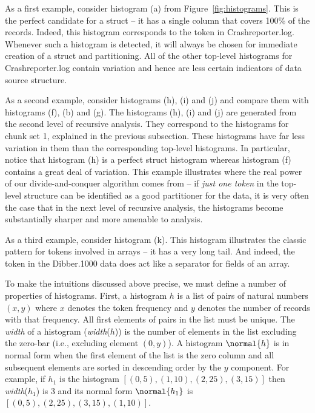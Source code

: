As a first example, consider histogram (a)
from Figure~\ref{fig:histograms}.  This is the perfect candidate for a 
struct --
it has a single column that covers 100\% of the records.  Indeed,
this histogram corresponds to the \cd{[*]} token in Crashreporter.log.
Whenever such a histogram is detected, it will always be chosen
for immediate creation of a struct and partitioning.  All of the
other top-level histograms for Crashreporter.log contain variation
and hence are less certain indicators of data source structure.

As a second example, consider histograms (h), (i) and (j) and compare
them with histograms (f), (b) and (g). The histograms (h), (i) and (j)
are generated from the second level of recursive analysis. They
correspond to the histograms for chunk set 1, explained in the
previous subsection.  These histograms have far less variation in them
than the corresponding top-level histograms.  In particular, notice
that histogram (h) is a perfect struct histogram whereas histogram (f)
contains a great deal of variation.  This example illustrates where
the real power of our divide-and-conquer algorithm comes from -- if
{\em just one token} in the top-level structure can be identified as a
good partitioner for the data, it is very often the case that in the
next level of recursive analysis, the histograms become substantially
sharper and more amenable to analysis.

As a third example, consider histogram (k).  This histogram illustrates
the classic pattern for tokens involved in arrays -- it has a very long
tail.  And indeed, the \cd{|} token in the Dibber.1000
data does act like a separator for fields of an array.

To make the intuitions discussed above precise, we must define a number of
properties of histograms.  First, a histogram $h$ is a list of pairs
of natural numbers $(x,y)$ where $x$ denotes the token frequency and
$y$ denotes the number of records with that frequency.  
All first elements of pairs in the list must be unique.  
The {\em width} of a
histogram ({\em width}($h$)) is the number of elements in the list
excluding the zero-bar ({i.e.,} excluding element $(0,y)$).  
A histogram
$\normal{h}$ is in normal form when the first element of the list is
the zero column and all subsequent elements are sorted in descending
order by the $y$ component.  For example, if $h_1$ is the histogram
$[(0,5), (1,10), (2,25), (3,15)]$ then {\em width}($h_1$) is 3 and its
normal form $\normal{h_1}$ is $[(0,5), (2, 25), (3,15), (1,10)]$.

